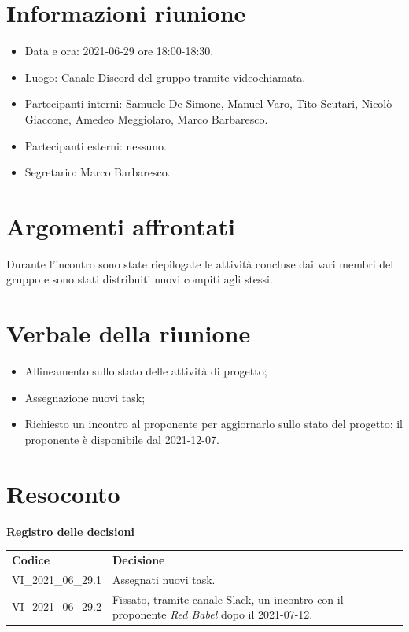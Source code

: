 \documentclass[a4paper]{article}
\begin{document}
\newpage
\tableofcontents
\newpage

\section{Informazioni riunione}
\begin{itemize}
    \item Data e ora: 2021-06-29 ore 18:00-18:30.
    \item Luogo: Canale Discord del gruppo tramite videochiamata.
    \item Partecipanti interni: Samuele De Simone, Manuel Varo, Tito Scutari, Nicolò Giaccone, Amedeo Meggiolaro, Marco Barbaresco.
    \item Partecipanti esterni: nessuno.
    \item Segretario: Marco Barbaresco.
\end{itemize}
\section{Argomenti affrontati}
Durante l'incontro sono state riepilogate le attività concluse dai vari membri del gruppo e sono stati distribuiti nuovi compiti agli stessi.
\section{Verbale della riunione}
\begin{itemize}
    \item Allineamento sullo stato delle attività di progetto;
    \item Assegnazione nuovi task;
    \item Richiesto un incontro al proponente per aggiornarlo sullo stato del progetto: il proponente è disponibile dal 2021-12-07.
\end{itemize}
\section{Resoconto}
\begin{center}
    \textbf{\Large Registro delle decisioni}\\
    \vspace{10px}
    \begin{table}[h!]
        \centering
        \renewcommand{\arraystretch}{1.8}
        \begin{tabular}{p{200px} p{200px}}
            \rowcolor{logo!70} \textbf{Codice} & \textbf{Decisione}                                                                                  \\
            VI\_2021\_06\_29.1                 & Assegnati nuovi task.                                                                               \\
            VI\_2021\_06\_29.2                 & Fissato, tramite canale Slack, un incontro con il proponente \textit{Red Babel} dopo il 2021-07-12. \\
        \end{tabular}
    \end{table}
\end{center}
\end{document}
